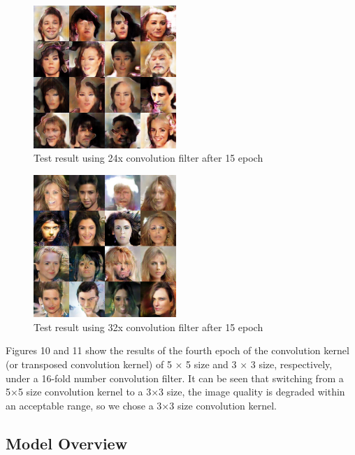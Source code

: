 \begin{figure}
    \begin{center}
    \includegraphics[width=0.48\textwidth]{figures/result_conv_filter_24.png}
    \caption{Test result using 24x convolution filter after 15 epoch}
    \label{conv_filter_24}
    \end{center}
\end{figure}

\begin{figure}
    \begin{center}
    \includegraphics[width=0.48\textwidth]{figures/result_conv_filter_32.png}
    \caption{Test result using 32x convolution filter after 15 epoch}
    \label{conv_filter_32}
    \end{center}
\end{figure}

Figures 10 and 11 show the results of the fourth epoch of the convolution kernel (or transposed convolution kernel) of 5 × 5 size and 3 × 3 size, respectively, under a 16-fold number convolution filter. It can be seen that switching from a 5×5 size convolution kernel to a 3×3 size, the image quality is degraded within an acceptable range, so we chose a 3×3 size convolution kernel.


\subsection{Model Overview}

